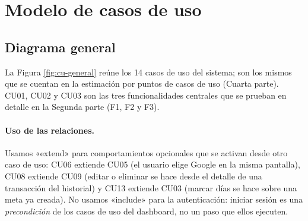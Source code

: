 \section{Modelo de casos de uso}\label{sec:cu}

\subsection{Diagrama general}

La Figura \ref{fig:cu-general} reúne los 14 casos de uso del sistema; son los mismos que se cuentan en la estimación por puntos de casos de uso (Cuarta parte). CU01, CU02 y CU03 son las tres funcionalidades centrales que se prueban en detalle en la Segunda parte (F1, F2 y F3).

\paragraph{Uso de las relaciones.} Usamos «extend» para comportamientos opcionales que se activan desde otro caso de uso: CU06 extiende CU05 (el usuario elige Google en la misma pantalla), CU08 extiende CU09 (editar o eliminar se hace desde el detalle de una transacción del historial) y CU13 extiende CU03 (marcar días se hace sobre una meta ya creada). No usamos «include» para la autenticación: iniciar sesión es una \emph{precondición} de los casos de uso del dashboard, no un paso que ellos ejecuten.

